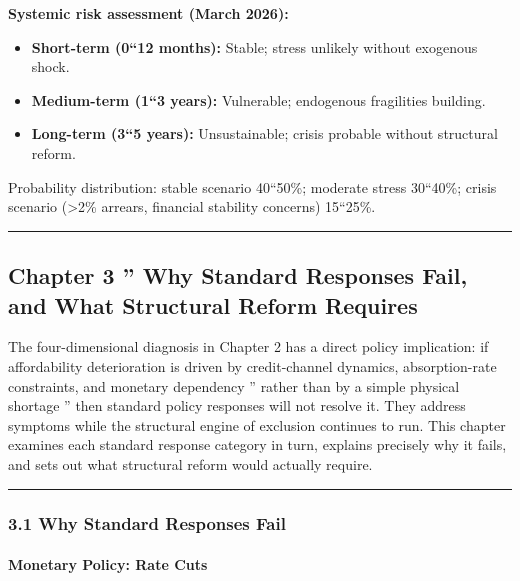 \documentclass[
]{article}
\providecommand{\tightlist}{%
  \setlength{\itemsep}{0pt}\setlength{\parskip}{0pt}}
\begin{document}
\textbf{Systemic risk assessment (March 2026):}

\begin{itemize}
\tightlist
\item
  \textbf{Short-term (0``12 months):} Stable; stress unlikely without
  exogenous shock.
\item
  \textbf{Medium-term (1``3 years):} Vulnerable; endogenous fragilities
  building.
\item
  \textbf{Long-term (3``5 years):} Unsustainable; crisis probable
  without structural reform.
\end{itemize}

Probability distribution: stable scenario 40``50\%; moderate stress
30``40\%; crisis scenario (\textgreater2\% arrears, financial stability
concerns) 15``25\%.

\begin{center}\rule{0.5\linewidth}{0.5pt}\end{center}

\protect{}\label{chapter-3}
\subsection{Chapter 3 '' Why Standard Responses Fail, and What
Structural Reform
Requires}\label{chapter-3-why-standard-responses-fail-and-what-structural-reform-requires}

The four-dimensional diagnosis in Chapter 2 has a direct policy
implication: if affordability deterioration is driven by credit-channel
dynamics, absorption-rate constraints, and monetary dependency '' rather
than by a simple physical shortage '' then standard policy responses
will not resolve it. They address symptoms while the structural engine
of exclusion continues to run. This chapter examines each standard
response category in turn, explains precisely why it fails, and sets out
what structural reform would actually require.

\begin{center}\rule{0.5\linewidth}{0.5pt}\end{center}

\subsubsection{3.1 Why Standard Responses
Fail}\label{why-standard-responses-fail}

\paragraph{Monetary Policy: Rate Cuts}\label{monetary-policy-rate-cuts}
\end{document}
